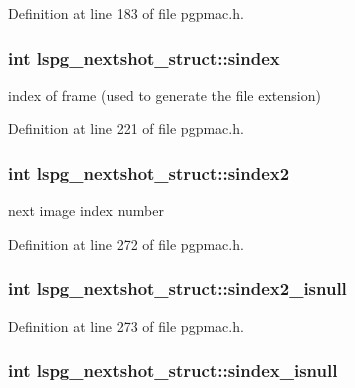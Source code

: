 Definition at line 183 of file pgpmac.h.\hypertarget{structlspg__nextshot__struct_a5d096f2c2bf9be29c44129b54eaf01da}{
\subsubsection[{sindex}]{\setlength{\rightskip}{0pt plus 5cm}int {\bf lspg\_\-nextshot\_\-struct::sindex}}}
\label{structlspg__nextshot__struct_a5d096f2c2bf9be29c44129b54eaf01da}


index of frame (used to generate the file extension) 

Definition at line 221 of file pgpmac.h.\hypertarget{structlspg__nextshot__struct_ae9d0cfdff6868e0ba9cd5acafbe133db}{
\subsubsection[{sindex2}]{\setlength{\rightskip}{0pt plus 5cm}int {\bf lspg\_\-nextshot\_\-struct::sindex2}}}
\label{structlspg__nextshot__struct_ae9d0cfdff6868e0ba9cd5acafbe133db}


next image index number 

Definition at line 272 of file pgpmac.h.\hypertarget{structlspg__nextshot__struct_a28e0b5c32a2741ef22edeb9d35b04e4d}{
\subsubsection[{sindex2\_\-isnull}]{\setlength{\rightskip}{0pt plus 5cm}int {\bf lspg\_\-nextshot\_\-struct::sindex2\_\-isnull}}}
\label{structlspg__nextshot__struct_a28e0b5c32a2741ef22edeb9d35b04e4d}


Definition at line 273 of file pgpmac.h.\hypertarget{structlspg__nextshot__struct_a7ca4fbc86974d1b75a681ba5ecaaf5af}{
\subsubsection[{sindex\_\-isnull}]{\setlength{\rightskip}{0pt plus 5cm}int {\bf lspg\_\-nextshot\_\-struct::sindex\_\-isnull}}}
\label{structlspg__nextshot__struct_a7ca4fbc86974d1b75a681ba5ecaaf5af}


